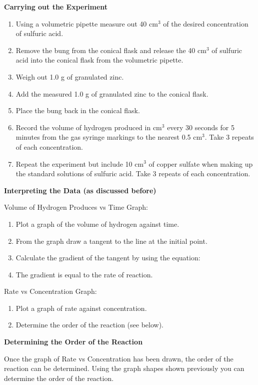 \textbf{Carrying out the Experiment}

\begin{enumerate}
\item Using a volumetric pipette measure out 40 cm$^3$ of the desired concentration of sulfuric acid.
\item Remove the bung from the conical flask and release the 40 cm$^3$ of sulfuric acid into the conical flask from the volumetric pipette.
\item Weigh out 1.0 g of granulated zinc.
\item Add the measured 1.0 g of granulated zinc to the conical flask.
\item Place the bung back in the conical flask.
\item Record the volume of hydrogen produced in cm$^3$ every 30 seconds for 5 minutes from the gas syringe markings to the nearest 0.5 cm$^3$. Take 3 repeats of each concentration.
\item Repeat the experiment but include 10 cm$^3$ of copper sulfate when making up the standard solutions of sulfuric acid. Take 3 repeats of each concentration.
\end{enumerate} 

\textbf{Interpreting the Data (as discussed before)}

Volume of Hydrogen Produces vs Time Graph:
\begin{enumerate}
\item Plot a graph of the volume of hydrogen against time.
\item From the graph draw a tangent to the line at the initial point.
\item Calculate the gradient of the tangent by using the equation: 
\item The gradient is equal to the rate of reaction.
\end{enumerate}

Rate vs Concentration Graph:
\begin{enumerate}
\item Plot a graph of rate against concentration.
\item Determine the order of the reaction (see below).
\end{enumerate}








\textbf{Determining the Order of the Reaction}

Once the graph of Rate vs Concentration has been drawn, the order of the reaction can be determined. Using the graph shapes shown previously you can determine the order of the reaction.

